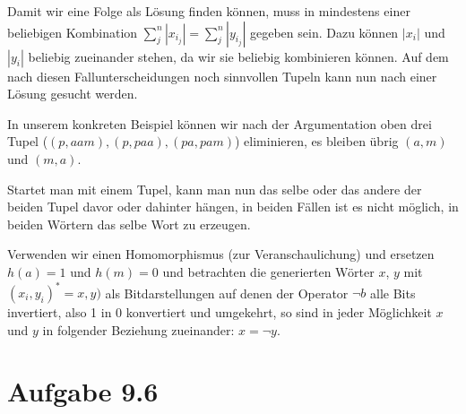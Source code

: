 \documentclass{article}
\begin{document}
Damit wir eine Folge als Lösung finden können, muss in mindestens einer beliebigen Kombination $\sum_j^n |x_{i_j}| = \sum_j^n |y_{i_j}|$ gegeben sein. Dazu können $|x_i|$ und $|y_i|$ beliebig zueinander stehen, da wir sie beliebig kombinieren können. Auf dem nach diesen Fallunterscheidungen noch sinnvollen Tupeln kann nun nach einer Lösung gesucht werden.

In unserem konkreten Beispiel können wir nach der Argumentation oben drei Tupel ($(p,aam),(p,paa),(pa,pam)$) eliminieren, es bleiben übrig $(a,m)$ und $(m,a)$. 

Startet man mit einem Tupel, kann man nun das selbe oder das andere der beiden Tupel davor oder dahinter hängen, in beiden Fällen ist es nicht möglich, in beiden Wörtern das selbe Wort zu erzeugen. 

Verwenden wir einen Homomorphismus (zur Veranschaulichung) und ersetzen $h(a)=1$ und $h(m)=0$ und betrachten die generierten Wörter $x$, $y$ mit $(x_i,y_i)^*=x,y)$ als Bitdarstellungen auf denen der Operator $\neg b$ alle Bits invertiert, also 1 in 0 konvertiert und umgekehrt, so sind in jeder Möglichkeit $x$ und $y$ in folgender Beziehung zueinander: $x=\neg y$.




\section*{Aufgabe 9.6}
\end{document}
